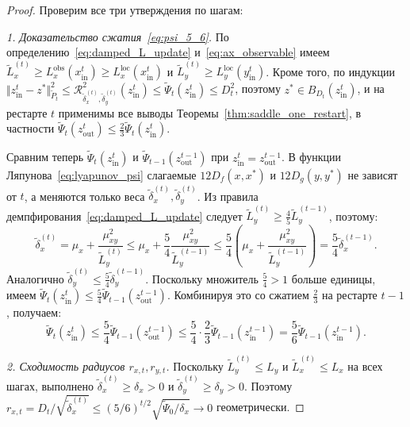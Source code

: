 \documentclass[11pt, a4paper]{article}
\theoremstyle{definition}
\begin{document}
\begin{proof}
Проверим все три утверждения по шагам:

\emph{1. Доказательство сжатия~\eqref{eq:psi_5_6}.} По определению~\eqref{eq:damped_L_update} и~\eqref{eq:ax_observable} имеем $\widetilde{L}_x^{(t)} \ge L_x^{\mathrm{obs}}(x_{\mathrm{in}}^t) \ge L_x^{\mathrm{loc}}(x_{\mathrm{in}}^t)$ и $\widetilde{L}_y^{(t)} \ge L_y^{\mathrm{loc}}(y_{\mathrm{in}}^t)$. Кроме того, по индукции $\Vert z_{\mathrm{in}}^t - z^* \Vert_{\widetilde{P}_t}^2 \le \mathcal{R}_{\widetilde{\delta}_x^{(t)}, \widetilde{\delta}_y^{(t)}}^2(z_{\mathrm{in}}^t) \le \widetilde{\Psi}_t(z_{\mathrm{in}}^t) \le D_t^2$, поэтому $z^* \in B_{D_t}(z_{\mathrm{in}}^t)$, и на рестарте $t$ применимы все выводы Теоремы~\ref{thm:saddle_one_restart}, в частности $\widetilde{\Psi}_t(z_{\mathrm{out}}^t) \le \frac{2}{3}\widetilde{\Psi}_t(z_{\mathrm{in}}^t)$.

Сравним теперь $\widetilde{\Psi}_t(z_{\mathrm{in}}^t)$ и $\widetilde{\Psi}_{t-1}(z_{\mathrm{out}}^{t-1})$ при $z_{\mathrm{in}}^t = z_{\mathrm{out}}^{t-1}$. В функции Ляпунова~\eqref{eq:lyapunov_psi} слагаемые $12 D_f(x, x^*)$ и $12 D_g(y, y^*)$ не зависят от $t$, а меняются только веса $\widetilde{\delta}_x^{(t)}, \widetilde{\delta}_y^{(t)}$. Из правила демпфирования~\eqref{eq:damped_L_update} следует $\widetilde{L}_y^{(t)} \ge \frac{4}{5}\widetilde{L}_y^{(t-1)}$, поэтому:
\[
\widetilde{\delta}_x^{(t)} = \mu_x + \frac{\mu_{xy}^2}{\widetilde{L}_y^{(t)}} \le \mu_x + \frac{5}{4}\frac{\mu_{xy}^2}{\widetilde{L}_y^{(t-1)}} \le \frac{5}{4}\left(\mu_x + \frac{\mu_{xy}^2}{\widetilde{L}_y^{(t-1)}}\right) = \frac{5}{4}\widetilde{\delta}_x^{(t-1)}.
\]
Аналогично $\widetilde{\delta}_y^{(t)} \le \frac{5}{4}\widetilde{\delta}_y^{(t-1)}$. Поскольку множитель $\frac{5}{4} > 1$ больше единицы, имеем $\widetilde{\Psi}_t(z_{\mathrm{in}}^t) \le \frac{5}{4}\widetilde{\Psi}_{t-1}(z_{\mathrm{out}}^{t-1})$. Комбинируя это со сжатием $\frac{2}{3}$ на рестарте $t - 1$, получаем:
\[
\widetilde{\Psi}_t(z_{\mathrm{in}}^t) \le \frac{5}{4}\widetilde{\Psi}_{t-1}(z_{\mathrm{out}}^{t-1}) \le \frac{5}{4}\cdot\frac{2}{3}\widetilde{\Psi}_{t-1}(z_{\mathrm{in}}^{t-1}) = \frac{5}{6}\widetilde{\Psi}_{t-1}(z_{\mathrm{in}}^{t-1}).
\]

\emph{2. Сходимость радиусов $r_{x,t}, r_{y,t}$.} Поскольку $\widetilde{L}_y^{(t)} \le L_y$ и $\widetilde{L}_x^{(t)} \le L_x$ на всех шагах, выполнено $\widetilde{\delta}_x^{(t)} \ge \delta_x > 0$ и $\widetilde{\delta}_y^{(t)} \ge \delta_y > 0$. Поэтому $r_{x,t} = D_t/\sqrt{\widetilde{\delta}_x^{(t)}} \le (5/6)^{t/2}\sqrt{\widetilde{\Psi}_0 / \delta_x} \to 0$ геометрически.


\end{proof}
\end{document}
